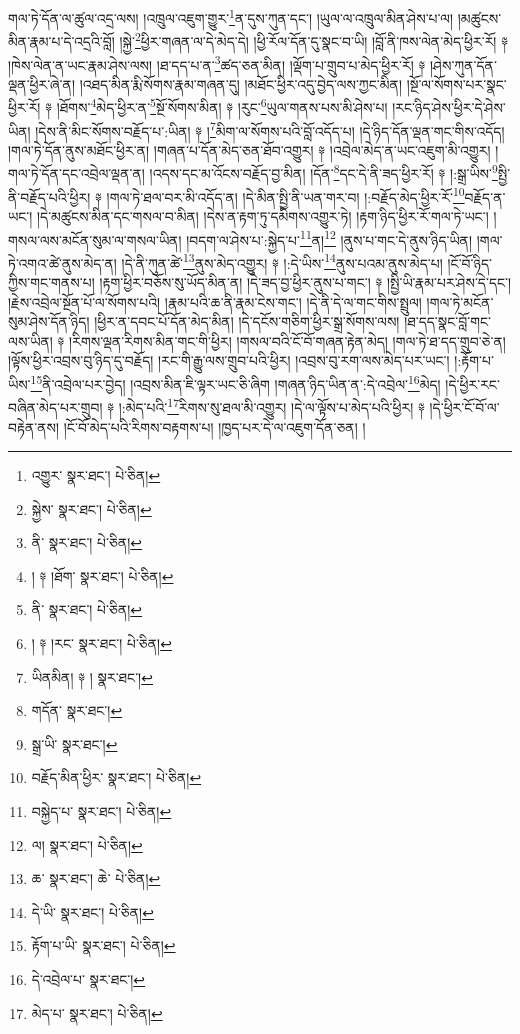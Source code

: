 གལ་ཏེ་དོན་ལ་ཚུལ་འདྲ་ལས། །འཁྲུལ་འཇུག་གྱུར་\footnote{འགྱུར་  སྣར་ཐང་།  པེ་ཅིན། }ན་དུས་ཀུན་དང་། །ཡུལ་ལ་འཁྲུལ་མིན་ཤེས་པ་ལ། །མཚུངས་མིན་རྣམ་པ་དེ་འདྲའི་བློ། །སྐྱེ་\footnote{སྐྱེས་  སྣར་ཐང་།  པེ་ཅིན། }ཕྱིར་གཞན་ལ་དེ་མེད་དེ། །ཕྱི་རོལ་དོན་དུ་སྣང་བ་ཡི། །བློ་ནི་ཁས་ལེན་མེད་ཕྱིར་རོ། ༈ །ཁེས་ལེན་ན་ཡང་རྣམ་ཤེས་ལས། །ཐ་དད་པ་ན་\footnote{ནི་  སྣར་ཐང་།  པེ་ཅིན། }ཚད་ཅན་མིན། །ལྡོག་པ་གྲུབ་པ་མེད་ཕྱིར་རོ། ༈ །ཤེས་ཀུན་དོན་ལྡན་ཕྱིར་ཞེ་ན། །འཐད་མིན་རྨི་སོགས་རྣམ་གཞན་དུ། །མཐོང་ཕྱིར་འདུ་བྱེད་ལས་ཀྱང་མིན། །སྔོ་ལ་སོགས་པར་སྣང་ཕྱིར་རོ། ༈ །ཐོགས་\footnote{། ༈ །ཐོག་  སྣར་ཐང་།  པེ་ཅིན། }མེད་ཕྱིར་ན་\footnote{ནི་  སྣར་ཐང་།  པེ་ཅིན། }སྔོ་སོགས་མིན། ༈ །རུང་\footnote{། ༈ །རང་  སྣར་ཐང་།  པེ་ཅིན། }ཡུལ་གནས་པས་མི་ཤེས་པ། །རང་ཉིད་ཤེས་ཕྱིར་དེ་ཤེས་ཡིན། །དེས་ནི་མིང་སོགས་བརྗོད་པ་:ཡིན། ༈ །\footnote{ཡིནམིན། ༈ །  སྣར་ཐང་། }མིག་ལ་སོགས་པའི་བློ་འདོད་པ། །དེ་ཉིད་དོན་ལྡན་གང་གིས་འདོད། །གལ་ཏེ་དོན་ནུས་མཐོང་ཕྱིར་ན། །གཞན་པ་དོན་མེད་ཅན་ཐོབ་འགྱུར། ༈ །འབྲེལ་མེད་ན་ཡང་འཇུག་མི་འགྱུར། །གལ་ཏེ་དོན་དང་འབྲེལ་ལྡན་ན། །འདས་དང་མ་འོངས་བརྗོད་བྱ་མིན། །དོན་\footnote{གདོན་  སྣར་ཐང་། }དང་དེ་ནི་ཟད་ཕྱིར་རོ། ༈ །:སྒྲ་ཡིས་\footnote{སྒྲ་ཡི་  སྣར་ཐང་། }སྤྱི་ནི་བརྗོད་པའི་ཕྱིར། ༈ །གལ་ཏེ་ཐལ་བར་མི་འདོད་ན། །དེ་མིན་སྤྱི་ནི་ཡན་གར་བ། །:བརྗོད་མེད་ཕྱིར་རོ་\footnote{བརྗོད་མིན་ཕྱིར་  སྣར་ཐང་།  པེ་ཅིན། }བརྗོད་ན་ཡང་། །དེ་མཚུངས་མིན་དང་གསལ་བ་མིན། །དེས་ན་རྟག་ཏུ་དམིགས་འགྱུར་ཏེ། །རྟག་ཉིད་ཕྱིར་རོ་གལ་ཏེ་ཡང་། །གསལ་ལས་མངོན་སུམ་ལ་གསལ་ཡིན། །བདག་ལ་ཤེས་པ་:སྐྱེད་པ་\footnote{བསྐྱེད་པ་  སྣར་ཐང་།  པེ་ཅིན། }ན།\footnote{ལ།  སྣར་ཐང་།  པེ་ཅིན། } །ནུས་པ་གང་དེ་ནུས་ཉིད་ཡིན། །གལ་ཏེ་འགའ་ཚེ་ནུས་མེད་ན། །དེ་ནི་ཀུན་ཚེ་\footnote{ཆ་  སྣར་ཐང་། ཆེ་  པེ་ཅིན། }ནུས་མེད་འགྱུར། ༈ །:དེ་ཡིས་\footnote{དེ་ཡི་  སྣར་ཐང་།  པེ་ཅིན། }ནུས་པའམ་ནུས་མེད་པ། །ངོ་བོ་ཉིད་ཀྱིས་གང་གནས་པ། །རྟག་ཕྱིར་བཅོས་སུ་ཡོད་མིན་ན། །དེ་ཟད་བྱ་ཕྱིར་ནུས་པ་གང་། ༈ །སྤྱི་ཡི་རྣམ་པར་ཤེས་དེ་དང་། །རྗེས་འབྲེལ་སྔོན་པོ་ལ་སོགས་པའི། །རྣམ་པའི་ཆ་ནི་རྣམ་ངེས་གང་། །དེ་ནི་དེ་ལ་གང་གིས་སྤྲུལ། །གལ་ཏེ་མངོན་སུམ་ཤེས་དོན་ཉིད། །ཕྱིར་ན་དབང་པོ་དོན་མེད་མིན། །དེ་དངོས་གཅིག་ཕྱིར་སྒྲ་སོགས་ལས། །ཐ་དད་སྣང་བློ་གང་ལས་ཡིན། ༈ །རིགས་ལྡན་རིགས་མིན་གང་གི་ཕྱིར། །གསལ་བའི་ངོ་བོ་གཞན་རྟེན་མེད། །གལ་ཏེ་ཐ་དད་གྲུབ་ཅེ་ན། །ལྟོས་ཕྱིར་འབྲས་བུ་ཉིད་དུ་བརྗོད། །རང་གི་རྒྱུ་ལས་གྲུབ་པའི་ཕྱིར། །འབྲས་བུ་རག་ལས་མེད་པར་ཡང་། །:རྟོག་པ་ཡིས་\footnote{རྟོག་པ་ཡི་  སྣར་ཐང་།  པེ་ཅིན། }ནི་འབྲེལ་པར་བྱེད། །འབྲས་མིན་ཇི་ལྟར་ཡང་ཅི་ཞིག །གཞན་ཉིད་ཡིན་ན་:དེ་འབྲེལ་\footnote{དེ་འབྲེལ་པ་  སྣར་ཐང་། }མེད། །དེ་ཕྱིར་རང་བཞིན་མེད་པར་གྲུབ། ༈ །:མེད་པའི་\footnote{མེད་པ་  སྣར་ཐང་།  པེ་ཅིན། }རིགས་སུ་ཐལ་མི་འགྱུར། །དེ་ལ་ལྟོས་པ་མེད་པའི་ཕྱིར། ༈ །དེ་ཕྱིར་ངོ་བོ་ལ་བརྟེན་ནས། །ངོ་བོ་མེད་པའི་རིགས་བརྟགས་པ། །ཁྱད་པར་དེ་ལ་འཇུག་དོན་ཅན། །
